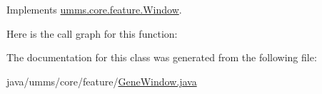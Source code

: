 Implements \hyperlink{interfaceumms_1_1core_1_1feature_1_1_window_a8294e5f6fb17bf1f3354e543231ae5ec}{umms.\+core.\+feature.\+Window}.



Here is the call graph for this function\+:




The documentation for this class was generated from the following file\+:\begin{DoxyCompactItemize}
\item 
java/umms/core/feature/\hyperlink{_gene_window_8java}{Gene\+Window.\+java}\end{DoxyCompactItemize}

